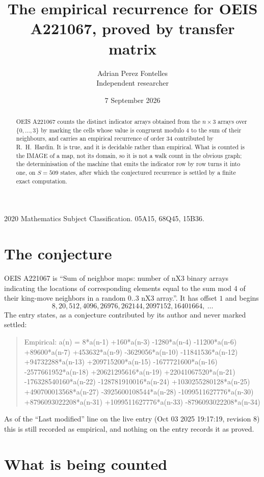 \documentclass[11pt,a4paper]{article}
\title{The empirical recurrence for OEIS A221067, proved by transfer matrix}
\author{Adrian Perez Fontelles\\ \small Independent researcher}
\date{7 September 2026}
\theoremstyle{plain}
\theoremstyle{definition}
\begin{document}
\maketitle

\begin{abstract}
OEIS A221067 counts the distinct indicator arrays obtained from the $n\times3$ arrays over
$\{0,\dots,3\}$ by marking the cells whose value is congruent modulo 4 to the sum of their neighbours, and carries an
empirical recurrence of order $34$ contributed by R.~H.~Hardin. It is true, and it is
decidable rather than empirical. What is counted is the IMAGE of a map, not its domain, so it
is not a walk count in the obvious graph; the determinisation of the machine that emits the
indicator row by row turns it into one, on $S=509$ states, after which the conjectured
recurrence is settled by a finite exact computation.
\end{abstract}

\noindent\small 2020 Mathematics Subject Classification. 05A15, 68Q45, 15B36.\normalsize

\section{The conjecture}

OEIS A221067 is ``Sum of neighbor maps: number of nX3 binary arrays indicating the locations of corresponding elements equal to the sum mod 4 of their king-move neighbors in a random 0..3 nX3 array.''. It has offset $1$ and begins
\[
8, 20, 512, 4096, 26976, 262144, 2097152, 16401664,\ \dots
\]
The entry states, as a conjecture contributed by its author and never marked settled:
\begin{quote}
Empirical: a(n) = 8*a(n-1) +160*a(n-3) -1280*a(n-4) -11200*a(n-6) +89600*a(n-7) +453632*a(n-9) -3629056*a(n-10) -11841536*a(n-12) +94732288*a(n-13) +209715200*a(n-15) -1677721600*a(n-16) -2577661952*a(n-18) +20621295616*a(n-19) +22041067520*a(n-21) -176328540160*a(n-22) -128781910016*a(n-24) +1030255280128*a(n-25) +490700013568*a(n-27) -3925600108544*a(n-28) -1099511627776*a(n-30) +8796093022208*a(n-31) +1099511627776*a(n-33) -8796093022208*a(n-34)
\end{quote}
As of the ``Last modified'' line on the live entry (Oct 03 2025 19:17:19, revision 8) this is still
recorded as empirical, and nothing on the entry records it as proved.

\section{What is being counted}
\end{document}
